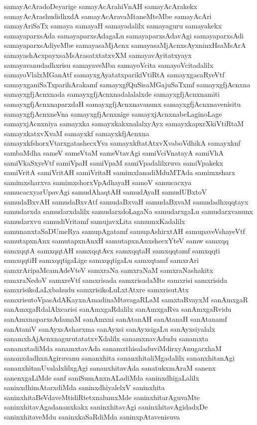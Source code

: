 {samayAcAradoDeyarige
samayAcArahiVnAH
samayAcArakekx
samayAcArashudidhxdA
samayAcAravaMtaneMteMbe
samayAcAri
samayAriSaTx
samaya
samayaH
samayadalilx
samayaguru
samayakekx
samayaparxsAda
samayaparxsAdagaLu
samayaparxsAdavAgi
samayaparxsAdi
samayaparxsAdiyeMbe
samayasaMjAcnx
samayasaMjAcnxsAyxninxHsaMsArA
samayashAcxpayxsaMsArasatxtatxvXM
samayavAyitatxyayx
samayavanudadhxrisu
samayaveMba
samayoVcita
samayoVcitadalilx
samayoVlalxMGanAtf
samayxgAyatatxparikiVtiRtA
samayxgacaRyeVtf
samayxganiSaTxparihArakamf
samayxgfQuSisaMGajuSaTxmf
samayxgfjAcnxna
samayxgfjAcnxnada
samayxgfjAcnxnadalalalxde
samayxgfjAcnxnamiti
samayxgfjAcnxnaparxdaH
samayxgfjAcnxnavanunx
samayxgfjAcnxnavenisitu
samayxgfjAcnxneVna
samayxgfjAcnxnige
samayxjAcnxnabeLaginoLage
samayxjAcnxniya
samayxka
samayxkakxnalalxyAyx
samayxkapxrXkiVtiRtaM
samayxkatxvXvaM
samayxkf
samayxkfjAcnxna
samayxkfshorxVtarxgatashecxYva
samayxkftatAtxvXvaboVdhikA
samayxknf
sambaMdha
sameV
sameVtaM
sameVtavAgi
samiVciVnatayA
samiVhA
samiVkaSxyeVtf
samiVpaH
samiVpaM
samiVpadalilxruva
samiVpakekx
samiVritA
samiVritAH
samiVritaH
samimxlanadiMduMTAda
samimxsharx
samimxsharxva
samimxshorxVpAdhayaH
samoV
samucacxya
samucacxyarUpavAgi
samudAhaqtAH
samudAyaH
samudUBxtoV
samudaBxvAH
samudaBxvAtf
samudaBxvaH
samudaBxvaM
samudadhxqqtayx
samudarxda
samudarxdalilx
samudarxdoLagaNa
samudarxgaLu
samudarxvanunx
samudarxvu
samudiVritamf
samujavxLita
samumxKadalilx
samunanxtaSaDUmeRya
samupAgatamf
samupAshirxtAH
samupaveVshayeVtf
samutapxnAnx
samutapxnAnxH
samutapxnAnxshecxYteV
samw
samxqq
samxqqtA
samxqqtAH
samxqqtAvx
samxqqtaH
samxqqtamf
samxqqti
samxqqtiH
samxqqtigaLige
samxqqtigaLu
samxqtamf
samxrAri
samxrAripaMcamAdeVteV
samxraNa
samxraNaM
samxraNashakitx
samxraNedoV
samxreVtf
samxrisada
samxrisadaMte
samxrisi
samxrisida
samxrisikoLaLxbahudu
samxrisikoLuLxtAtxre
samxrisutAtx
samxrisutoVpasAdAKayxnAmadinaMtavagaRLaM
samxtaRvayxM
sanAmxgaR
sanAmxgaRdalAlxcarisi
sanAmxgaRdalilx
sanAmxgaRva
sanAmxgaRvidu
sanAmxnaparxsAdamaM
sanAmxni
sanAtanAH
sanAtanaH
sanAtanamf
sanAtaniV
sanAyxsAsharxma
sanAyxsi
sanAyxsigaLu
sanAyxsiyalalx
sanamxhAjAcnxnagurutatatxvXdalilx
sanamxnavAdudu
sanamxta
sanamxtadiMda
sanamxtavAda
sanamxthisaladuviMdirxyAnugarxhaM
sananxdadhxnAgiruvanu
sananxhita
sananxhitaliMgadalilx
sananxhitanAgi
sananxhitanUvalalxlilxgAgi
sananxhitavAda
sanatukxmAraM
sanenx
sanenxgaLiMde
sanf
saniSumAnxnALadiMda
saninxdhigaLalilx
saninxdhimAtarxdiMda
saninxdhiyalelxV
saninxhita
saninxhitaBeVdaveMtidiRtetxnalumxMde
saninxhitarAguvaMte
saninxhitavAgadananxkakx
saninxhitavAgi
saninxhitavAgidadxDe
saninxhitaveMdu
saninxkaSaRdiMda
saninxpAtavenisuva
}
